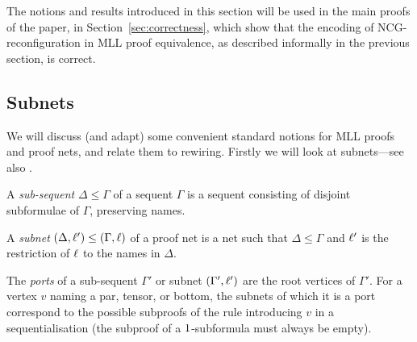 \documentclass{lmcs}
\let\capsabbrev=\uppercase
\begin{document}
The notions and results introduced in this section will be used in the main proofs of the paper, in Section~\ref{sec:correctness}, which show that the encoding of \capsabbrev{ncg}-reconfiguration in \capsabbrev{mll} proof equivalence, as described informally in the previous section, is correct.



\subsection*{Subnets}


We will discuss (and adapt) some convenient standard notions for \capsabbrev{mll} proofs and proof nets, and relate them to rewiring. Firstly we will look at subnets---see also \cite{Bellin-vandeWiele-1995}.

\begin{definition}
A \emph{sub-sequent} $\Delta\leq\Gamma$ of a sequent $\Gamma$ is a sequent consisting of disjoint subformulae of $\Gamma$, preserving names.
\end{definition}

\begin{definition}
A \emph{subnet} $(\Delta,\ell') \leq (\Gamma,\ell)$ of a proof net is a net such that $\Delta\leq\Gamma$ and $\ell'$ is the restriction of $\ell$ to the names in $\Delta$.
\end{definition}

The \emph{ports} of a sub-sequent $\Gamma'$ or subnet $(\Gamma',\ell')$ are the root vertices of $\Gamma'$. For a vertex $v$ naming a par, tensor, or bottom, the subnets of which it is a port correspond to the possible subproofs of the rule introducing $v$ in a sequentialisation (the subproof of a $1$-subformula must always be empty).
\end{document}
